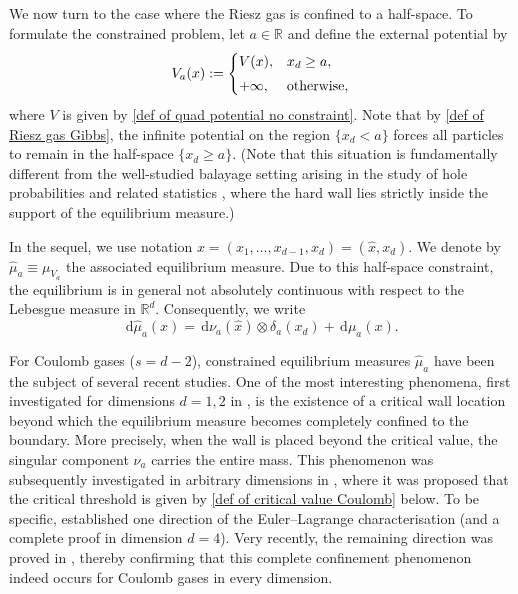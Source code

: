 \documentclass{amsart}
\def\wh{\widehat}
\def\R{\mathbb{R}}
\newcommand{\ud}{\, \mathrm{d}}
\theoremstyle{plain}
\theoremstyle{remark}
\numberwithin{equation}{section}
\begin{document}
\medskip 

We now turn to the case where the Riesz gas is confined to a half-space. To formulate the constrained problem, let \(a\in\mathbb{R}\) and define the external potential by
\begin{equation} \label{def of Va constrained potential}
  V_a(x):= 
    \begin{cases}
        V(x), &x_d\ge a,
        \smallskip 
        \\
        +\infty, & \text{otherwise},
    \end{cases}
\end{equation} 
where $V$ is given by \eqref{def of quad potential no constraint}. 
Note that by \eqref{def of Riesz gas Gibbs}, the infinite potential on the region $\{x_d<a\}$ forces all particles to remain in the half-space $\{x_d\ge a\}$. (Note that this situation is fundamentally different from the
well-studied balayage setting arising in the study of hole
probabilities and related statistics
\cite{AR17,Ad18,Ch23a,Ch23,BP26,CW25,CFLV17,CFLV19,AZ15}, where the hard wall
lies strictly inside the support of the equilibrium measure.) 



In the sequel, we use notation $x= (x_1,\ldots, x_{d-1},x_d) =(\hat{x}, x_d)$. 
We denote by $\wh \mu_a \equiv \mu_{ V_a }$ the associated equilibrium measure.  
Due to this half-space constraint, the equilibrium is in general not absolutely continuous with respect to the Lebesgue measure in $\R^d$. Consequently, we write 
\begin{equation} 
    \ud\wh{\mu}_a(x) = \ud \nu_a(\hat{x})\otimes \delta_a(x_d) + \ud\mu_a(x). 
\end{equation}


For Coulomb gases ($s=d-2$), constrained equilibrium measures $\wh{\mu}_a$ have been the subject of several recent studies.  One of the most interesting phenomena, first investigated for dimensions
$d=1,2$ in \cite{DKMSS17,ASZ14}, is the existence of a critical wall
location beyond which the equilibrium measure becomes completely confined to
the boundary. More precisely, when the wall is placed beyond the
critical value, the singular component $\nu_a$ carries the entire mass.
This phenomenon was subsequently investigated in arbitrary dimensions
in \cite{BFMS26}, where it was proposed that the critical threshold is
given by \eqref{def of critical value Coulomb} below.   
To be specific, \cite{BFMS26} established one direction of the
Euler--Lagrange characterisation (and a complete proof in dimension
$d=4$). Very recently, the remaining direction was proved in
\cite{FIT26}, thereby confirming that this complete confinement
phenomenon indeed occurs for Coulomb gases in every dimension.
\end{document}
